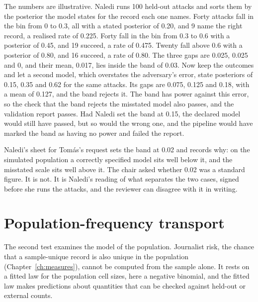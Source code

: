 \begin{example}\label{c15:ex-calib}
The numbers are illustrative. Naledi runs 100 held-out attacks and sorts them by the
posterior the model states for the record each one names. Forty attacks fall in the bin
from 0 to 0.3, all with a stated posterior of 0.20, and 9 name the right record, a
realised rate of 0.225. Forty fall in the bin from 0.3 to 0.6 with a posterior of 0.45,
and 19 succeed, a rate of 0.475. Twenty fall above 0.6 with a posterior of 0.80, and 16
succeed, a rate of 0.80. The three gaps are 0.025, 0.025 and 0, and their mean, 0.017,
lies inside the band of 0.03. Now keep the outcomes and let a second model, which
overstates the adversary's error, state posteriors of 0.15, 0.35 and 0.62 for the same
attacks. Its gaps are 0.075, 0.125 and 0.18, with a mean of 0.127, and the band rejects
it. The band has power against this error, so the check that the band rejects the
misstated model also passes, and the validation report passes. Had Naledi set the band at
0.15, the declared model would still have passed, but so would the wrong one, and the
pipeline would have marked the band as having no power and failed the report.
\end{example}


Naledi's sheet for Tomás's request sets the band at 0.02 and records why: on the
simulated population a correctly specified model sits well below it, and the
misstated scale sits well above it. The chair asked whether 0.02 was a standard
figure. It is not. It is Naledi's reading of what separates the two cases, signed
before she runs the attacks, and the reviewer can disagree with it in writing.

\section{Population-frequency transport}

The second test examines the model of the population. Journalist risk, the chance
that a sample-unique record is also unique in the population
(Chapter~\ref{ch:measures}), cannot be computed from the sample alone. It rests on a
fitted law for the population cell sizes, here a negative binomial, and the fitted
law makes predictions about quantities that can be checked against held-out or
external counts.

